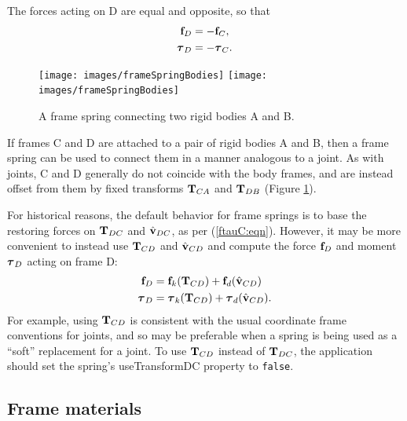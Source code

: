 The forces acting on D are equal and opposite, so that
%
\begin{align}
{\bf f}_D & = - {\bf f}_C, \notag \\
\boldsymbol\tau_D & = - \boldsymbol\tau_C.
\label{ftau2:eqn}
\end{align}
%

\begin{figure}[ht]
\begin{center}
 \iflatexml
   \texttt{[image: images/frameSpringBodies]}
 \else
   \texttt{[image: images/frameSpringBodies]}
 \fi
\end{center}
\caption{A frame spring connecting two rigid bodies A and B.}
\label{frameSpringBodies:fig}
\end{figure}

If frames C and D are attached to a pair of rigid bodies A and B, then
a frame spring can be used to connect them in a manner analogous to a
joint. As with joints, C and D generally do not coincide with the body
frames, and are instead offset from them by fixed transforms ${\bf T}_{CA}$
and ${\bf T}_{DB}$ (Figure \ref{frameSpringBodies:fig}).

\begin{sideblock}

For historical reasons, the default behavior for frame springs is to base the
restoring forces on ${\bf T}_{DC}$ and $\hat{{\bf v}}_{DC}$, as per (\ref{ftauC:eqn}).
However, it may be more convenient to instead use ${\bf T}_{CD}$ and $\hat{{\bf v}}_{CD}$
and compute the force ${\bf f}_D$ and moment $\boldsymbol\tau_D$ acting on frame D:
%
\begin{align}
{\bf f}_D & = {\bf f}_{k} ({\bf T}_{CD}) + {\bf f}_{d} (\hat{{\bf v}}_{CD}) \notag \\
\boldsymbol\tau_D & = \boldsymbol\tau_{k} ({\bf T}_{CD}) + \boldsymbol\tau_{d} (\hat{{\bf v}}_{CD}).
\label{ftauD:eqn}
\end{align}
%
For example, using ${\bf T}_{CD}$ is consistent with the usual coordinate frame
conventions for joints, and so may be preferable when a spring is being used as
a ``soft'' replacement for a joint.  To use ${\bf T}_{CD}$ instead of ${\bf T}_{DC}$, the
application should set the spring's {\sf useTransformDC} property to {\tt false}.
\end{sideblock}

\subsection{Frame materials}

